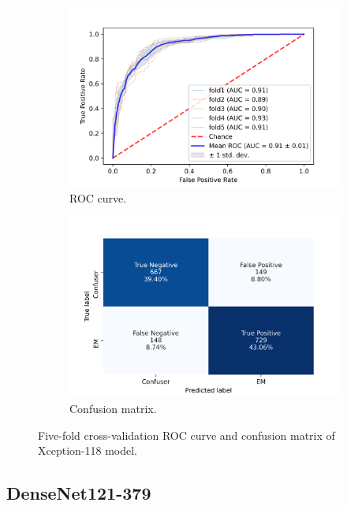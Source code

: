 \begin{figure}[h!]
	\centering
	\begin{subfigure}[b]{0.49\textwidth}
		\centering
		\includegraphics[width=\textwidth,keepaspectratio]{images/Supplement4/image116.png}
		\caption{ROC curve.}
	\end{subfigure}
	\hfill
	\begin{subfigure}[b]{0.49\textwidth}
		\centering
		\includegraphics[width=\textwidth,keepaspectratio]{images/Supplement4/image122.png}
		\caption{Confusion matrix.}
	\end{subfigure}
	\caption{Five-fold cross-validation ROC curve and confusion matrix of Xception-118 model.}
\end{figure}

\vfill\clearpage
\subsection{DenseNet121-379}

